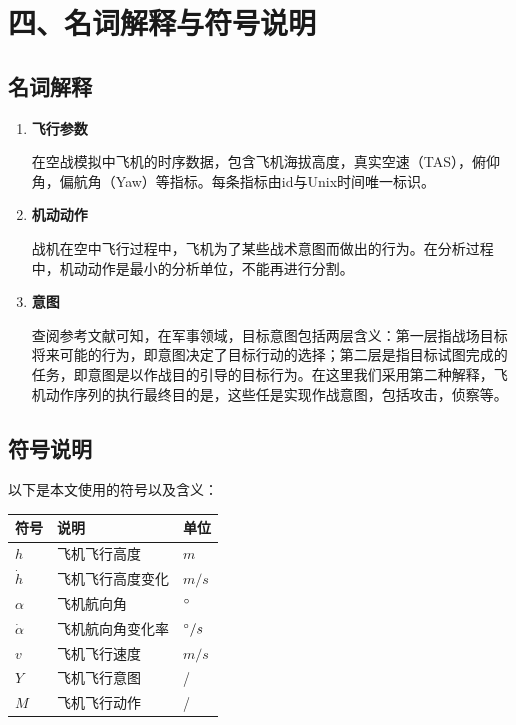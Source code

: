 \documentclass{my_paper}
\begin{document}
\section{四、名词解释与符号说明}
\subsection{名词解释}
\begin{enumerate}
    \item \textbf{飞行参数}
    
    在空战模拟中飞机的时序数据，包含飞机海拔高度，真实空速（TAS），俯仰角，偏航角（Yaw）等指标。每条指标由id与Unix时间唯一标识。
    
    \item \textbf{机动动作}
    
    战机在空中飞行过程中，飞机为了某些战术意图而做出的行为。在分析过程中，机动动作是最小的分析单位，不能再进行分割。

    \item \textbf{意图}
    
    查阅参考文献\cite{11}可知，在军事领域，目标意图包括两层含义：第一层指战场目标将来可能的行为，即意图决定了目标行动的选择；第二层是指目标试图完成的任务，即意图是以作战目的引导的目标行为。在这里我们采用第二种解释，飞机动作序列的执行最终目的是，这些任是实现作战意图，包括攻击，侦察等。
    
\end{enumerate}
\subsection{符号说明}
以下是本文使用的符号以及含义：
\begin{table}[h]%
    \centering
    \begin{tabular}{p{2.0cm}<{\centering}p{9.0cm}<{\centering}p{2.0cm}<{\centering}}
    \hline
    符号 & 说明 & 单位 \\ %
    \hline
    $h$ & 飞机飞行高度 &  $m$\\
    $\dot{h}$ & 飞机飞行高度变化 &  $m/s$\\
    $\alpha$ & 飞机航向角 &  $\degree$\\
    $\dot{\alpha}$ & 飞机航向角变化率 &  $\degree/s$\\
    $v$ & 飞机飞行速度 &  $m/s$\\
    $Y$ & 飞机飞行意图 &  /\\
    $M$ & 飞机飞行动作 &  /\\
    
    \hline
    \end{tabular}
\end{table}
\end{document}
